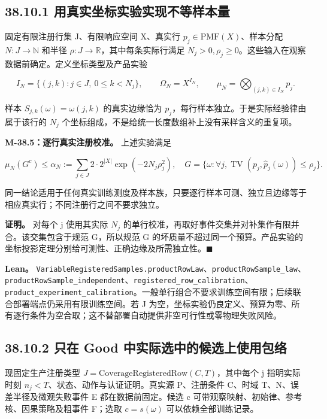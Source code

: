 \documentclass[
  11pt,
  oneside]{book}
\begin{document}
\subsection{38.10.1 用真实坐标实验实现不等样本量}\label{ux7528ux771fux5b9eux5750ux6807ux5b9eux9a8cux5b9eux73b0ux4e0dux7b49ux6837ux672cux91cf}

固定有限注册行集 J、有限响应空间 X、真实行 \(p_j\in\mathrm{PMF}(X)\)、样本分配 \(N:J\to\mathbb N\) 和半径 \(\rho:J\to\mathbb R\)，其中每条实际行满足 \(N_j>0,\rho_j\ge0\)。这些输入在观察数据前确定。定义坐标类型及产品实验

\[I_N=\{(j,k):j\in J,\ 0\le k<N_j\},\qquad
\Omega_N=X^{I_N},\qquad
\mu_N=\bigotimes_{(j,k)\in I_N}p_j.\]

样本 \(S_{j,k}(\omega)=\omega(j,k)\) 的真实边缘恰为 \(p_j\)，每行样本独立。于是实际经验律由属于该行的 \(N_j\) 个坐标组成，不是给统一长度数组补上没有采样含义的重复项。

\hypertarget{m-38-5}{}\label{m-38-5}

\textbf{M-38.5：逐行真实注册校准。} 上述实验满足

\[\mu_N(G^c)\le
\alpha_N:=\sum_{j\in J}2\cdot2^{|X|}
\exp(-2N_j\rho_j^2),
\quad
G=\{\omega:\forall j,\operatorname{TV}(p_j,\widehat p_j(\omega))\le\rho_j\}.\]

同一结论适用于任何真实训练测度及样本族，只要逐行样本可测、独立且边缘等于相应真实行；不同注册行之间不要求独立。

\textbf{证明。} 对每个 j 使用其实际 \(N_j\) 的单行校准，再取好事件交集并对补集作有限并合。该交集包含于规范 G，所以规范 G 的坏质量不超过同一个预算。产品实验的坐标投影定理分别给可测性、正确边缘及所需独立性。\(\blacksquare\)

\textbf{Lean。} \nolinkurl{VariableRegisteredSamples.productRowLaw}、\nolinkurl{productRowSample_law}、\nolinkurl{productRowSample_independent}、\nolinkurl{registered_row_calibration}、\nolinkurl{product_experiment_calibration}。一般单行组合不要求训练空间有限；后续联合部署端点仍采用有限训练空间。若 J 为空，坐标实验仍良定义、预算为零、所有逐行条件为空合取；这不替部署自动提供非空可行性或零物理失败风险。

\subsection{38.10.2 只在 Good 中实际选中的候选上使用包络}\label{ux53eaux5728-good-ux4e2dux5b9eux9645ux9009ux4e2dux7684ux5019ux9009ux4e0aux4f7fux7528ux5305ux7edc}

现固定生产注册类型 \(J=\mathrm{CoverageRegisteredRow}(C,T)\)，其中每个 j 指明实际时刻 \(n_j<T\)、状态、动作与认证证明。真实源 P、注册条件 C、时域 T、N、误差半径及微观失败事件 E 都在数据前固定。候选 c 可带观察映射、初始律、参考核、因果策略及粗事件 F；选取 \(c=s(\omega)\) 可以依赖全部训练记录。
\end{document}
